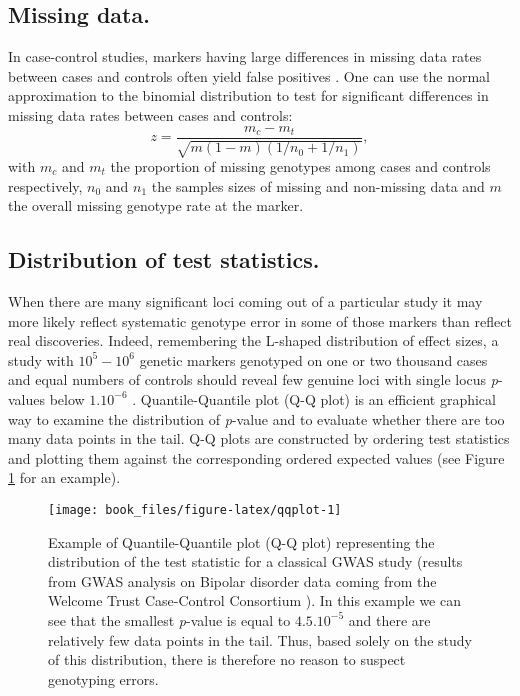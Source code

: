 \documentclass[]{book}
\begin{document}
\hypertarget{missing-data.}{%
\subsection{Missing data.}\label{missing-data.}}

In case-control studies, markers having large differences in missing
data rates between cases and controls often yield false positives
\citep{clayton2005population}. One can use the normal approximation to the
binomial distribution to test for significant differences in missing
data rates between cases and controls:
\[z = \frac{m_c - m_t}{\sqrt{m(1-m)(1/n_0+1/n_1)}},\] with \(m_c\) and
\(m_t\) the proportion of missing genotypes among cases and controls
respectively, \(n_0\) and \(n_1\) the samples sizes of missing and
non-missing data and \(m\) the overall missing genotype rate at the
marker.

\hypertarget{distribution-of-test-statistics.}{%
\subsection{Distribution of test statistics.}\label{distribution-of-test-statistics.}}

When there are many significant loci coming out of a particular study it
may more likely reflect systematic genotype error in some of those
markers than reflect real discoveries. Indeed, remembering the L-shaped
distribution of effect sizes, a study with \(10^5-10^6\) genetic markers
genotyped on one or two thousand cases and equal numbers of controls
should reveal few genuine loci with single locus \emph{p}-values below
\(1.10^{-6}\) \citep{zondervan2004complex}. Quantile-Quantile plot (Q-Q plot)
is an efficient graphical way to examine the distribution of \emph{p}-value
and to evaluate whether there are too many data points in the tail. Q-Q
plots are constructed by ordering test statistics and plotting them
against the corresponding ordered expected values (see Figure
\ref{fig:qqplot} for an example).



\begin{figure}

{\centering \texttt{[image: book\_files/figure-latex/qqplot-1]} 

}

\caption{Example of Quantile-Quantile plot (Q-Q plot) representing the distribution of the test statistic for a classical GWAS study (results from GWAS analysis on Bipolar disorder data coming from the Welcome Trust Case-Control Consortium \citep{burton_genome-wide_2007}). In this example we can see that the smallest \emph{p}-value is equal to \(4.5.10^{-5}\) and there are relatively few data points in the tail. Thus, based solely on the study of this distribution, there is therefore no reason to suspect genotyping errors.}\label{fig:qqplot}
\end{figure}
\end{document}
